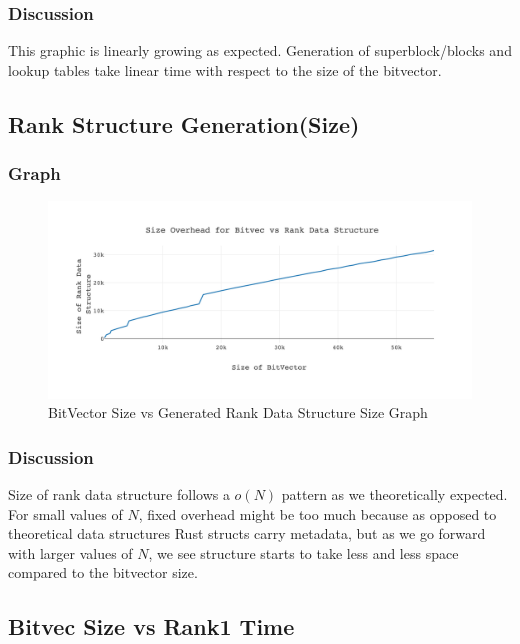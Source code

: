 \documentclass{report}
\begin{document}
\subsubsection*{Discussion}
This graphic is linearly growing as expected. Generation of superblock/blocks and lookup tables take linear time with respect to the size of the bitvector. 

\newpage

\subsection*{Rank Structure Generation(Size)}

\subsubsection*{Graph}

\begin{figure}[h!]
    \centering
    \includegraphics[scale=0.15]{diagram-20220306.png}
    \caption{BitVector Size vs Generated Rank Data Structure Size Graph}
    \label{fig:my_label}
\end{figure}

\subsubsection*{Discussion}
Size of rank data structure follows a $o(N)$ pattern as we theoretically expected. For small values of $N$, fixed overhead might be too much because as opposed to theoretical data structures Rust structs carry metadata, but as we go forward with larger values of $N$, we see structure starts to take less and less space compared to the bitvector size. 
\newpage

\subsection*{Bitvec Size vs Rank1 Time}
\end{document}
